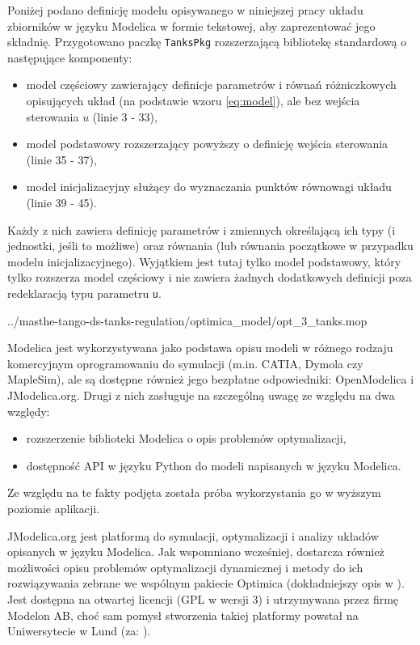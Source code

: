 Poniżej podano definicję modelu opisywanego w niniejszej pracy układu zbiorników w języku Modelica w formie tekstowej, aby zaprezentować jego składnię. Przygotowano paczkę \texttt{TanksPkg} rozszerzającą bibliotekę standardową o następujące komponenty:
\begin{itemize}
    \item model częściowy zawierający definicje parametrów i równań różniczkowych opisujących układ (na podstawie wzoru \ref{eq:model}), ale bez wejścia sterowania $u$ (linie 3 - 33),
    \item model podstawowy rozszerzający powyższy o definicję wejścia sterowania (linie 35 - 37),
    \item model inicjalizacyjny służący do wyznaczania punktów równowagi układu (linie 39 - 45).
\end{itemize}

Każdy z nich zawiera definicję parametrów i zmiennych określającą ich typy (i jednostki, jeśli to możliwe) oraz równania (lub równania początkowe w przypadku modelu inicjalizacyjnego). Wyjątkiem jest tutaj tylko model podstawowy, który tylko rozszerza model częściowy i nie zawiera żadnych dodatkowych definicji poza redeklaracją typu parametru \texttt{u}.


{../masthe-tango-ds-tanks-regulation/optimica_model/opt_3_tanks.mop}

Modelica jest wykorzystywana jako podstawa opisu modeli w różnego rodzaju komercyjnym oprogramowaniu do symulacji (m.in. CATIA, Dymola czy MapleSim), ale są dostępne również jego bezpłatne odpowiedniki: OpenModelica i JModelica.org. Drugi z nich zasługuje na szczególną uwagę ze względu na dwa względy:
\begin{itemize}
    \item rozszerzenie biblioteki Modelica o opis problemów optymalizacji,
    \item dostępność API w języku Python do modeli napisanych w języku Modelica.
\end{itemize} 
Ze względu na te fakty podjęta została próba wykorzystania go w wyższym poziomie aplikacji.

JModelica.org jest platformą do symulacji, optymalizacji i analizy układów opisanych w języku Modelica. Jak wspomniano wcześniej, dostarcza również możliwości opisu problemów optymalizacji dynamicznej i metody do ich rozwiązywania zebrane we wspólnym pakiecie Optimica (dokładniejszy opis w \cite{JModelicaUserGuide}). Jest dostępna na otwartej licencji (GPL w wersji 3) i utrzymywana przez firmę Modelon AB, choć sam pomysł stworzenia takiej platformy powstał na Uniwersytecie w Lund (za: \cite{JModelicaWebsite}).

